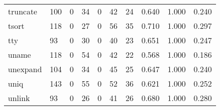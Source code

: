 \begin{longtable}{lp{1.3cm}p{1.3cm}p{1.3cm}p{1.3cm}p{1.3cm}p{1.3cm}p{1.3cm}p{1.3cm}p{1.3cm}}
truncate  &                    100 &                                  0 &                                34 &                                0 &                                42 &                              24 &                                0.640 &                                  1.000 &                                0.240 \\
tsort     &                    118 &                                  0 &                                27 &                                0 &                                56 &                              35 &                                0.710 &                                  1.000 &                                0.297 \\
tty       &                     93 &                                  0 &                                30 &                                0 &                                40 &                              23 &                                0.651 &                                  1.000 &                                0.247 \\
uname     &                    118 &                                  0 &                                54 &                                0 &                                42 &                              22 &                                0.568 &                                  1.000 &                                0.186 \\
unexpand  &                    104 &                                  0 &                                34 &                                0 &                                45 &                              25 &                                0.647 &                                  1.000 &                                0.240 \\
uniq      &                    143 &                                  0 &                                55 &                                0 &                                52 &                              36 &                                0.621 &                                  1.000 &                                0.252 \\
unlink    &                     93 &                                  0 &                                26 &                                0 &                                41 &                              26 &                                0.680 &                                  1.000 &                                0.280 \\

\end{longtable}
